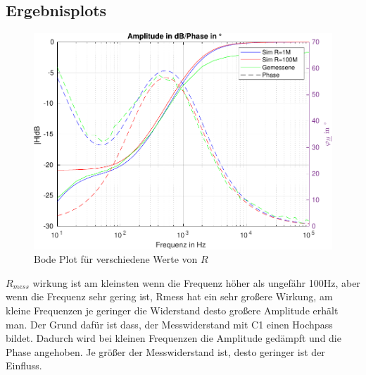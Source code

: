 \subsection{Ergebnisplots}
\label{subsec:4_Plots}
%
%
\begin{figure}[H]
	\centering
	\includegraphics[scale=.8]{src/labor5.pdf}
	\caption{Bode Plot für verschiedene Werte von $R$}
	\label{fig:Bode Plot Simulation}
  \end{figure}
%
%
%
$R_{mess}$ wirkung ist am kleinsten wenn die Frequenz höher als ungefähr 100Hz, aber wenn die Frequenz sehr gering ist, Rmess hat ein sehr großere Wirkung, am kleine Frequenzen je geringer die Widerstand desto großere Amplitude erhält man. Der Grund dafür ist dass, der Messwiderstand mit C1 einen Hochpass bildet. Dadurch wird bei kleinen Frequenzen die Amplitude gedämpft und die Phase angehoben. Je größer der Messwiderstand ist, desto geringer ist der Einfluss.


\begin{flushright}
  \textit{\autorA}
\end{flushright}
%
%
%
%